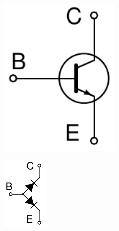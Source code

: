 \documentclass[beamer]{standalone}
\begin{document}
\begin{frame}
\begin{columns}[t]
\begin{column}{.5\textwidth}
\begin{columns}[t]
\begin{column}{.40\textwidth}
			\end{column}
			\begin{column}{.60\textwidth}
				\begin{figure}
					\includegraphics[width=0.80\textwidth]{./schematics/npn_transistor.pdf}
				\end{figure}
				\begin{figure}
					\includegraphics[width=0.30\textwidth]{./schematics/npn_diodes.pdf}
				\end{figure}
			\end{column}
		\end{columns}


\end{column}
\end{columns}
\end{frame}
\end{document}
